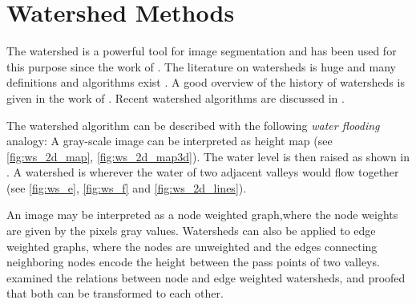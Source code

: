 \section{Watershed Methods}\label{sec:rw_watershed_methods}

The watershed is a powerful tool for image segmentation and
has been used for this purpose since the work of
\citet{beucher_1979_workshop}.
The literature on watersheds is huge and 
many definitions and algorithms exist
\citep{vinent_1991_pami,beuchner_1994_waterfall,najman_1994_sp,
roerdink_2000_finf,bertrand_2005_jmiv,cousty_2009_pami,
meyer_2012_corr,meyer_2012_corr2}.
A good overview  of the history of watersheds 
is given in the work of \citet{meyer_2012_corr}.
Recent watershed algorithms are discussed in \citep{meyer_2012_corr2}.

The watershed algorithm can be described with the following  \emph{water flooding} analogy:
A gray-scale  image can be interpreted as height map (see \cref{fig:ws_2d_map}, \cref{fig:ws_2d_map3d}).
The water level is then raised as shown in .
A watershed is wherever the water of two adjacent valleys would flow together (see \cref{fig:ws_e}, \cref{fig:ws_f} and \cref{fig:ws_2d_lines}).


An image may be interpreted as a node weighted graph,where the node weights
are given by the pixels gray values.
Watersheds can also be applied to edge weighted graphs, where the nodes are unweighted 
and the edges connecting neighboring nodes encode the height between the pass points of two valleys.
\citet{meyer_2012_corr2} examined the relations between node and edge weighted watersheds, 
and proofed that both can be transformed to each other.





